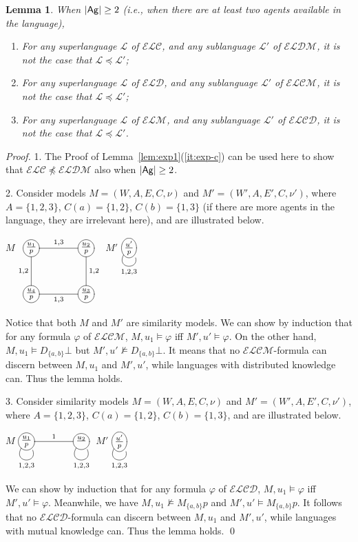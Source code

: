 \documentclass{article}
\newtheorem{lemma}[theorem]{Lemma}%
\newcommand{\ab}{\ensuremath{A}\xspace}
\newcommand{\ag}{\text{\normalfont\textsf{Ag}}\xspace}
\renewcommand{\phi}{\varphi}
\newcommand{\langc}{\ensuremath{\mathcal{ELC}}\xspace}
\newcommand{\langd}{\ensuremath{\mathcal{ELD}}\xspace}
\newcommand{\langm}{\ensuremath{\mathcal{ELM}}\xspace}
\newcommand{\langcd}{\ensuremath{\mathcal{ELCD}}\xspace}
\newcommand{\langcm}{\ensuremath{\mathcal{ELCM}}\xspace}
\newcommand{\langdm}{\ensuremath{\mathcal{ELDM}}\xspace}
\newcommand{\langl}{\ensuremath{\mathcal{L}}\xspace}
\begin{document}
\begin{lemma}\label{lem:exp2}
When $|\ag| \geq 2$ (i.e., when there are at least two agents available in the language), 
\begin{enumerate}
\item For any superlanguage $\langl$ of \langc, and any sublanguage $\langl'$ of $\langdm$, it is not the case that $\langl \preceq \langl'$;
%
\item For any superlanguage $\langl$ of \langd, and any sublanguage $\langl'$ of $\langcm$, it is not the case that $\langl \preceq \langl'$;
%
\item For any superlanguage $\langl$ of \langm, and any sublanguage $\langl'$ of $\langcd$, it is not the case that $\langl \preceq \langl'$.
\end{enumerate}
\end{lemma}
\begin{proof}
1. The Proof of Lemma~\ref{lem:exp1}(\ref{it:exp-c}) can be used here to show that $\langc \not\preceq \langdm$ also when $|\ag| \geq 2$.

2. Consider models $M=(W,\ab,E,C,\nu)$ and $M'=(W',\ab,E',C,\nu')$, where $\ab=\{1,2,3\}$, $C(a)=\{1,2\}$, $C(b)=\{1,3\}$ (if there are more agents in the language, they are irrelevant here), and are illustrated below.
\begin{center}
$M$\quad$\xymatrix@R=3em@C=4em{
			*+o[F]{\frac{u_1}{p}} \ar@{-}[d]_{1,2} \ar@{-}[r]^{1,3} & *+o[F]{\frac{u_2}{p}} \ar@{-}[d]^{1,2} \\
			*+o[F]{\frac{u_4}{p}} \ar@{-}[r]_{1,3} & *+o[F]{\frac{u_3}{p}}
		}$
\qquad\qquad
$M'$\quad$\xymatrix@R=3em@C=4em{
			*+o[F]{\frac{u'}{p}} \ar@{-}@(dl,dr)_{1,2,3} 
		}$
\end{center}
Notice that both $M$ and $M'$ are similarity models.
%
We can show by induction that for any formula $\phi$ of \langcm, $M,u_1\models\phi$ iff $M',u'\models\phi$. On the other hand, $M,u_1\models D_{\{a,b\}}\bot$ but $M',u'\not\models D_{\{a,b\}}\bot$.
%
It means that no \langcm-formula can discern between $M,u_1$ and $M',u'$, while languages with distributed knowledge can. Thus the lemma holds.

3. Consider similarity models $M=(W,\ab,E,C,\nu)$ and $M'=(W',\ab,E',C,\nu')$, where $\ab=\{1,2,3\}$, $C(a)=\{1,2\}$, $C(b)=\{1,3\}$, and are illustrated below.
\begin{center}
$M$\quad$\xymatrix@R=3em@C=4em{
			*+o[F]{\frac{u_1}{p}} \ar@{-}@(dl,dr)_{1,2,3} \ar@{-}[r]^{1} & *+o[F]{\frac{u_2}{}} \ar@{-}@(dl,dr)_{1,2,3} 
		}$
\qquad\qquad
$M'$\quad$\xymatrix@R=3em@C=4em{
			*+o[F]{\frac{u'}{p}} \ar@{-}@(dl,dr)_{1,2,3} 
		}$
\end{center}
We can show by induction that for any formula $\phi$ of \langcd, $M,u_1\models\phi$ iff $M',u'\models\phi$. Meanwhile, we have $M,u_1\not\models M_{\{a,b\}}p$ and $M',u'\models M_{\{a,b\}}p$. It follows that no \langcd-formula can discern between $M,u_1$ and $M',u'$, while languages with mutual knowledge can. Thus the lemma holds.
\qed
\end{proof}
\end{document}
